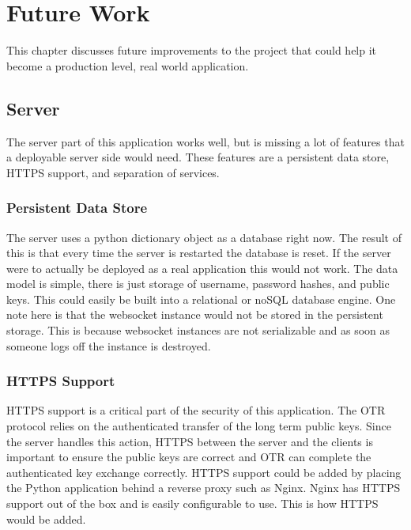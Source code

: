 

\chapter{Future Work}


This chapter discusses future improvements to the project that could help it become a production level, real world application.


\section{Server}


The server part of this application works well, but is missing a lot of features that a deployable server side would need. These features are a persistent data store, HTTPS support, and separation of services.


\subsection{Persistent Data Store}


The server uses a python dictionary object as a database right now. The result of this is that every time the server is restarted the database is reset. If the server were to actually be deployed as a real application this would not work. The data model is simple, there is just storage of username, password hashes, and public keys. This could easily be built into a relational or noSQL database engine. One note here is that the websocket instance would not be stored in the persistent storage. This is because websocket instances are not serializable and as soon as someone logs off the instance is destroyed.


\subsection{HTTPS Support}


HTTPS support is a critical part of the security of this application. The OTR protocol relies on the authenticated transfer of the long term public keys. Since the server handles this action, HTTPS between the server and the clients is important to ensure the public keys are correct and OTR can complete the authenticated key exchange correctly. HTTPS support could be added by placing the Python application behind a reverse proxy such as Nginx. \cite{nginx} Nginx has HTTPS support out of the box and is easily configurable to use. This is how HTTPS would be added.


